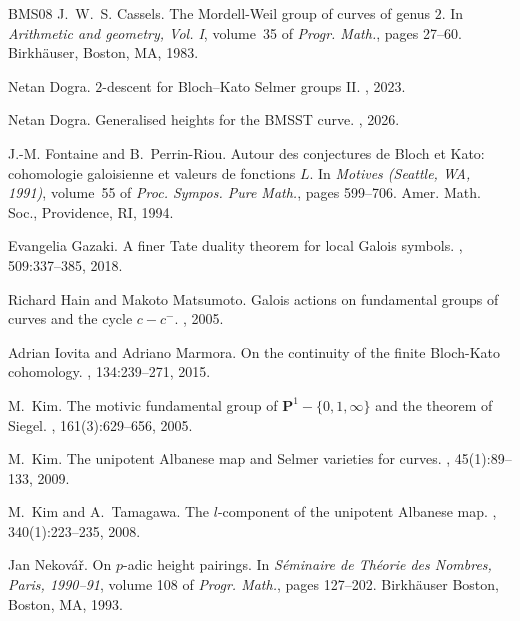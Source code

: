 \documentclass[11pt]{amsart}
\theoremstyle{plain}
\theoremstyle{definition}
\begin{document}
\begin{thebibliography}{BMS{\etalchar{+}}08}
J.~W.~S. Cassels.
\newblock The {M}ordell-{W}eil group of curves of genus {$2$}.
\newblock In {\em Arithmetic and geometry, {V}ol. {I}}, volume~35 of {\em Progr. Math.}, pages 27--60. Birkh\"{a}user, Boston, MA, 1983.

Netan Dogra.
\newblock $2$-descent for {B}loch--{K}ato {S}elmer groups {II}.
, 2023.

Netan Dogra.
\newblock Generalised heights for the {BMSST} curve.
, 2026.

J.-M. Fontaine and B.~Perrin-Riou.
\newblock Autour des conjectures de {B}loch et {K}ato: cohomologie galoisienne et valeurs de fonctions {$L$}.
\newblock In {\em Motives ({S}eattle, {WA}, 1991)}, volume~55 of {\em Proc. Sympos. Pure Math.}, pages 599--706. Amer. Math. Soc., Providence, RI, 1994.

Evangelia Gazaki.
\newblock A finer {T}ate duality theorem for local {G}alois symbols.
, 509:337--385, 2018.

Richard Hain and Makoto Matsumoto.
\newblock Galois actions on fundamental groups of curves and the cycle $c-c^-$.
, 2005.

Adrian Iovita and Adriano Marmora.
\newblock On the continuity of the finite {B}loch-{K}ato cohomology.
, 134:239--271, 2015.

M.~Kim.
\newblock The motivic fundamental group of $\mathbf{P}^1 -\{0,1,\infty\}$ and the theorem of {S}iegel.
, 161(3):629--656, 2005.

M.~Kim.
\newblock The unipotent {A}lbanese map and {S}elmer varieties for curves.
, 45(1):89--133, 2009.

M.~Kim and A.~Tamagawa.
\newblock The {$l$}-component of the unipotent {A}lbanese map.
, 340(1):223--235, 2008.

Jan Nekov\'{a}\v{r}.
\newblock On {$p$}-adic height pairings.
\newblock In {\em S\'{e}minaire de {T}h\'{e}orie des {N}ombres, {P}aris, 1990--91}, volume 108 of {\em Progr. Math.}, pages 127--202. Birkh\"{a}user Boston, Boston, MA, 1993.


\end{thebibliography}
\end{document}
